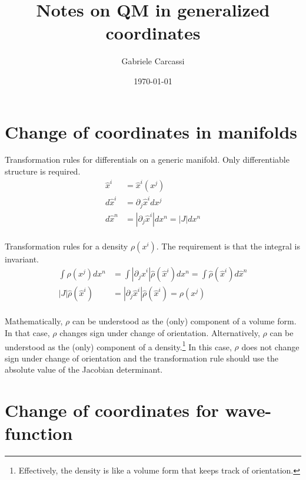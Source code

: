 \documentclass[11pt]{article}
\begin{document}
\title{Notes on QM in generalized coordinates}
\author{Gabriele Carcassi}

\date{\today}

\maketitle

\begin{abstract}
\end{abstract}

\section{Change of coordinates in manifolds}
Transformation rules for differentials on a generic manifold. Only differentiable structure is required.
\begin{equation}
	\begin{aligned}
		\hat{x}^i &= \hat{x}^i(x^j) \\
		d\hat{x}^i &= \partial_j \hat{x}^i dx^j \\
		d\hat{x}^n &= | \partial_j \hat{x}^i | dx^n = |J| dx^n \\
	\end{aligned}
\end{equation}

Transformation rules for a density $\rho(x^i)$. The requirement is that the integral is invariant.
\begin{equation}
	\begin{aligned}
		\int \rho(x^j) dx^n &= \int | \partial_j \hat{x}^i | \hat{\rho}(\hat{x}^i) dx^n = \int \hat{\rho}(\hat{x}^i) d\hat{x}^n \\
		|J| \hat{\rho}(\hat{x}^i) &= | \partial_j \hat{x}^i | \hat{\rho}(\hat{x}^i)  = \rho(x^j) \\
	\end{aligned}
\end{equation}

Mathematically, $\rho$ can be understood as the (only) component of a volume form. In that case, $\rho$ changes sign under change of orientation. Alternatively, $\rho$ can be understood as the (only) component of a density.\footnote{Effectively, the density is like a volume form that keeps track of orientation.} In this case, $\rho$ does not change sign under change of orientation and the transformation rule should use the absolute value of the Jacobian determinant.

\section{Change of coordinates for wave-function}
\end{document}

